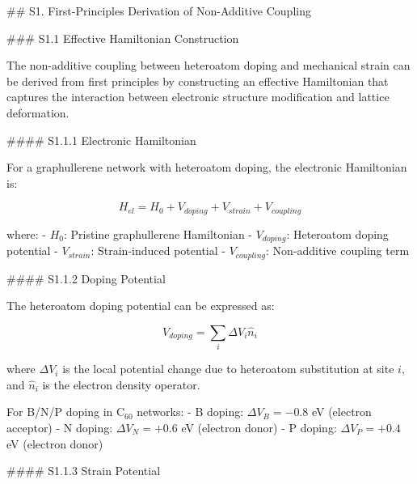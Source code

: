 

## S1. First-Principles Derivation of Non-Additive Coupling

### S1.1 Effective Hamiltonian Construction

The non-additive coupling between heteroatom doping and mechanical strain can be derived from first principles by constructing an effective Hamiltonian that captures the interaction between electronic structure modification and lattice deformation.

#### S1.1.1 Electronic Hamiltonian

For a graphullerene network with heteroatom doping, the electronic Hamiltonian is:

\begin{equation}
H_{el} = H_0 + V_{doping} + V_{strain} + V_{coupling}
\label{eq:S1_hamiltonian}
\end{equation}

where:
- $H_0$: Pristine graphullerene Hamiltonian
- $V_{doping}$: Heteroatom doping potential
- $V_{strain}$: Strain-induced potential
- $V_{coupling}$: Non-additive coupling term

#### S1.1.2 Doping Potential

The heteroatom doping potential can be expressed as:

\begin{equation}
V_{doping} = \sum_{i} \Delta V_i \hat{n}_i
\label{eq:S1_doping}
\end{equation}

where $\Delta V_i$ is the local potential change due to heteroatom substitution at site $i$, and $\hat{n}_i$ is the electron density operator.

For B/N/P doping in C$_{60}$ networks:
- B doping: $\Delta V_B = -0.8$ eV (electron acceptor)
- N doping: $\Delta V_N = +0.6$ eV (electron donor)  
- P doping: $\Delta V_P = +0.4$ eV (electron donor)

#### S1.1.3 Strain Potential

